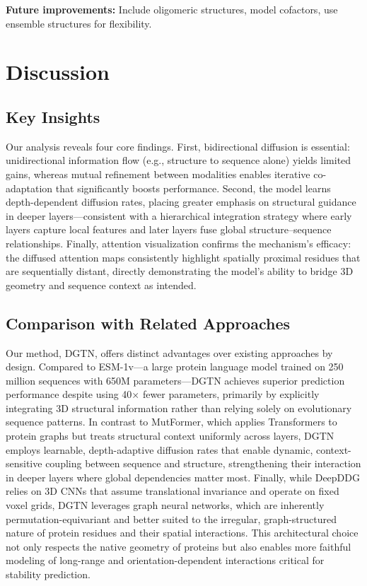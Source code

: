 \documentclass[11pt]{article}
\begin{document}
\textbf{Future improvements:} Include oligomeric structures, model cofactors, use ensemble structures for flexibility.



\section{Discussion}
\subsection*{Key Insights}

Our analysis reveals four core findings. First, bidirectional diffusion is
essential: unidirectional information flow (e.g., structure to sequence alone)
yields limited gains, whereas mutual refinement between modalities enables
iterative co-adaptation that significantly boosts performance. Second, the
model learns depth-dependent diffusion rates, placing greater emphasis on
structural guidance in deeper layers—consistent with a hierarchical integration
strategy where early layers capture local features and later layers fuse global
structure–sequence relationships. 
Finally,
attention visualization confirms the mechanism’s efficacy: the diffused
attention maps consistently highlight spatially proximal residues that are
sequentially distant, directly demonstrating the model’s ability to bridge 3D
geometry and sequence context as intended.


\subsection*{Comparison with Related Approaches}

Our method, DGTN, offers distinct advantages over existing approaches by
design. Compared to ESM-1v—a large protein language model trained on 250
million sequences with 650M parameters—DGTN achieves superior prediction
performance despite using 40× fewer parameters, primarily by explicitly
integrating 3D structural information rather than relying solely on
evolutionary sequence patterns. In contrast to MutFormer, which applies
Transformers to protein graphs but treats structural context uniformly across
layers, DGTN employs learnable, depth-adaptive diffusion rates that enable
dynamic, context-sensitive coupling between sequence and structure,
strengthening their interaction in deeper layers where global dependencies
matter most. Finally, while DeepDDG relies on 3D CNNs that assume translational
invariance and operate on fixed voxel grids, DGTN leverages graph neural
networks, which are inherently permutation-equivariant and better suited to the
irregular, graph-structured nature of protein residues and their spatial
interactions. This architectural choice not only respects the native geometry
of proteins but also enables more faithful modeling of long-range and
orientation-dependent interactions critical for stability prediction.
\end{document}

